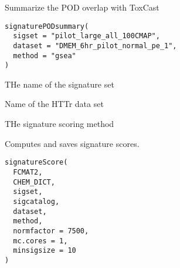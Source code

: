 \documentclass[letterpaper]{book}
\begin{document}
%
\begin{Description}\relax
Summarize the POD overlap with ToxCast
\end{Description}
%
\begin{Usage}
\begin{verbatim}
signaturePODsummary(
  sigset = "pilot_large_all_100CMAP",
  dataset = "DMEM_6hr_pilot_normal_pe_1",
  method = "gsea"
)
\end{verbatim}
\end{Usage}
%
\begin{Arguments}
\begin{ldescription}
\item[\code{sigset}] THe name of the signature set

\item[\code{dataset}] Name of the HTTr data set

\item[\code{method}] THe signature scoring method
\end{ldescription}
\end{Arguments}
%
\begin{Description}\relax
Computes and saves signature scores.
\end{Description}
%
\begin{Usage}
\begin{verbatim}
signatureScore(
  FCMAT2,
  CHEM_DICT,
  sigset,
  sigcatalog,
  dataset,
  method,
  normfactor = 7500,
  mc.cores = 1,
  minsigsize = 10
)
\end{verbatim}
\end{Usage}
%
\end{document}
